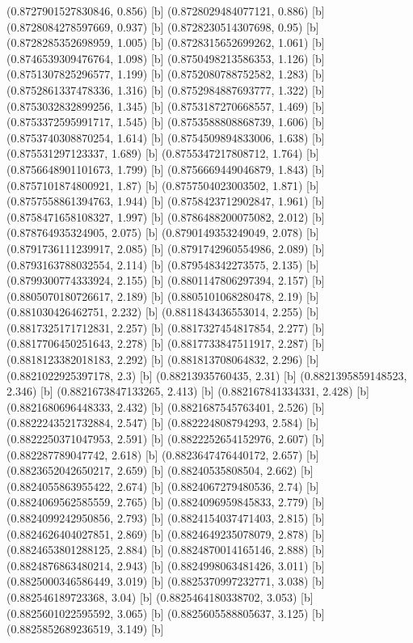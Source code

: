{{{(0.8727901527830846, 0.856) [b] 
(0.8728029484077121, 0.886) [b] 
(0.8728084278597669, 0.937) [b] 
(0.8728230514307698, 0.95) [b] 
(0.8728285352698959, 1.005) [b] 
(0.8728315652699262, 1.061) [b] 
(0.8746539309476764, 1.098) [b] 
(0.8750498213586353, 1.126) [b] 
(0.8751307825296577, 1.199) [b] 
(0.8752080788752582, 1.283) [b] 
(0.8752861337478336, 1.316) [b] 
(0.8752984887693777, 1.322) [b] 
(0.8753032832899256, 1.345) [b] 
(0.8753187270668557, 1.469) [b] 
(0.8753372595991717, 1.545) [b] 
(0.8753588808868739, 1.606) [b] 
(0.8753740308870254, 1.614) [b] 
(0.8754509894833006, 1.638) [b] 
(0.875531297123337, 1.689) [b] 
(0.8755347217808712, 1.764) [b] 
(0.8756648901101673, 1.799) [b] 
(0.8756669449046879, 1.843) [b] 
(0.8757101874800921, 1.87) [b] 
(0.8757504023003502, 1.871) [b] 
(0.8757558861394763, 1.944) [b] 
(0.8758423712902847, 1.961) [b] 
(0.8758471658108327, 1.997) [b] 
(0.8786488200075082, 2.012) [b] 
(0.878764935324905, 2.075) [b] 
(0.8790149353249049, 2.078) [b] 
(0.8791736111239917, 2.085) [b] 
(0.8791742960554986, 2.089) [b] 
(0.8793163788032554, 2.114) [b] 
(0.879548342273575, 2.135) [b] 
(0.8799300774333924, 2.155) [b] 
(0.8801147806297394, 2.157) [b] 
(0.8805070180726617, 2.189) [b] 
(0.8805101068280478, 2.19) [b] 
(0.881030426462751, 2.232) [b] 
(0.8811843436553014, 2.255) [b] 
(0.8817325171712831, 2.257) [b] 
(0.8817327454817854, 2.277) [b] 
(0.8817706450251643, 2.278) [b] 
(0.8817733847511917, 2.287) [b] 
(0.8818123382018183, 2.292) [b] 
(0.881813708064832, 2.296) [b] 
(0.8821022925397178, 2.3) [b] 
(0.88213935760435, 2.31) [b] 
(0.8821395859148523, 2.346) [b] 
(0.8821673847133265, 2.413) [b] 
(0.882167841334331, 2.428) [b] 
(0.8821680696448333, 2.432) [b] 
(0.8821687545763401, 2.526) [b] 
(0.8822243521732884, 2.547) [b] 
(0.882224808794293, 2.584) [b] 
(0.8822250371047953, 2.591) [b] 
(0.8822252654152976, 2.607) [b] 
(0.882287789047742, 2.618) [b] 
(0.8823647476440172, 2.657) [b] 
(0.8823652042650217, 2.659) [b] 
(0.88240535808504, 2.662) [b] 
(0.8824055863955422, 2.674) [b] 
(0.8824067279480536, 2.74) [b] 
(0.8824069562585559, 2.765) [b] 
(0.8824096959845833, 2.779) [b] 
(0.8824099242950856, 2.793) [b] 
(0.8824154037471403, 2.815) [b] 
(0.8824626404027851, 2.869) [b] 
(0.8824649235078079, 2.878) [b] 
(0.8824653801288125, 2.884) [b] 
(0.8824870014165146, 2.888) [b] 
(0.8824876863480214, 2.943) [b] 
(0.8824998063481426, 3.011) [b] 
(0.8825000346586449, 3.019) [b] 
(0.8825370997232771, 3.038) [b] 
(0.882546189723368, 3.04) [b] 
(0.8825464180338702, 3.053) [b] 
(0.8825601022595592, 3.065) [b] 
(0.8825605588805637, 3.125) [b] 
(0.8825852689236519, 3.149) [b] 
}}}

